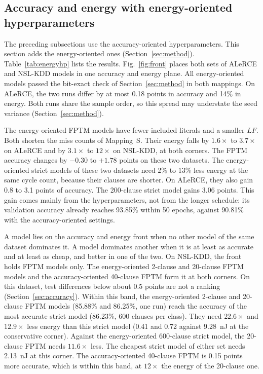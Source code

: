 \documentclass[preprint,review,12pt]{elsarticle}
\newcommand{\LF}{\mathit{LF}}
\newcommand{\wosnew}[1]{#1}   %
\begin{document}
\subsection{Accuracy and energy with energy-oriented hyperparameters}\label{sec:energyhp}
\wosnew{The preceding subsections use the accuracy-oriented hyperparameters. This section adds the energy-oriented ones (Section~\ref{sec:method}).
Table~\ref{tab:energyhp} lists the results. Fig.~\ref{fig:front} places both sets of ALeRCE and NSL-KDD models in one accuracy and energy plane.
All energy-oriented models passed the bit-exact check of Section~\ref{sec:method} in both mappings.
On ALeRCE, the two runs differ by at most 0.18 points in accuracy and 14\% in energy.
Both runs share the sample order, so this spread may understate the seed variance (Section~\ref{sec:method}).}

\wosnew{The energy-oriented FPTM models have fewer included literals and a smaller $\LF$. Both shorten the miss counts of Mapping~S.
Their energy falls by $1.6\times$ to $3.7\times$ on ALeRCE and by $3.1\times$ to $12\times$ on NSL-KDD, at both corners.
The FPTM accuracy changes by $-0.30$ to $+1.78$ points on these two datasets.
The energy-oriented strict models of these two datasets need 2\% to 13\% less energy at the same cycle count, because their clauses are shorter. On ALeRCE, they also gain 0.8 to 3.1 points of accuracy.
The 200-clause strict model gains 3.06 points. This gain comes mainly from the hyperparameters, not from the longer schedule: its validation accuracy already reaches 93.85\% within 50 epochs, against 90.81\% with the accuracy-oriented settings.}

\wosnew{A model lies on the accuracy and energy front when no other model of the same dataset dominates it. A model dominates another when it is at least as accurate and at least as cheap, and better in one of the two.
On NSL-KDD, the front holds FPTM models only. The energy-oriented 2-clause and 20-clause FPTM models and the accuracy-oriented 40-clause FPTM form it at both corners.
On this dataset, test differences below about 0.5 points are not a ranking (Section~\ref{sec:accuracy}).
Within this band, the energy-oriented 2-clause and 20-clause FPTM models (85.88\% and 86.25\%, one run) reach the accuracy of the most accurate strict model (86.23\%, 600 clauses per class).
They need $22.6\times$ and $12.9\times$ less energy than this strict model (0.41 and 0.72 against 9.28~nJ at the conservative corner).
Against the energy-oriented 600-clause strict model, the 20-clause FPTM needs $11.6\times$ less. The cheapest strict model of either set needs 2.13~nJ at this corner.
The accuracy-oriented 40-clause FPTM is 0.15 points more accurate, which is within this band, at $12\times$ the energy of the 20-clause one.}
\end{document}
